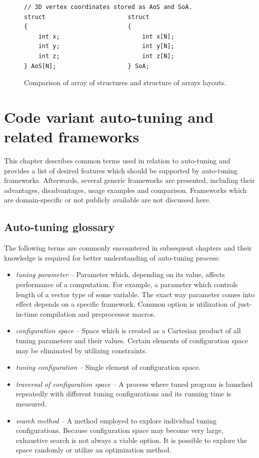 \documentclass
[
    digital, %
    oneside, %
    table, %
    nolof, %
    nolot, %
    nocover %
]{fithesis3}
\begin{document}
\begin{figure}
\begin{lstlisting}
// 3D vertex coordinates stored as AoS and SoA.
struct                       struct
{                            {
    int x;                       int x[N];
    int y;                       int y[N];
    int z;                       int z[N];
} AoS[N];                    } SoA;
\end{lstlisting}
\caption{Comparison of array of structures and structure of arrays layouts.}
\label{aos_soa}
\end{figure}

\chapter{Code variant auto-tuning and related frameworks}
This chapter describes common terms used in relation to auto-tuning and provides a list of desired features which should be supported by auto-tuning
frameworks. Afterwards, several generic frameworks are presented, including their advantages, disadvantages, usage examples and comparison. Frameworks
which are domain-specific or not publicly available are not discussed here.

\section{Auto-tuning glossary}
The following terms are commonly encountered in subsequent chapters and their knowledge is required for better understanding of auto-tuning process:
\begin{itemize}
    \item \textit{tuning parameter} -- Parameter which, depending on its value, affects performance of a computation. For example, a parameter which
    controls length of a vector type of some variable. The exact way parameter comes into effect depends on a specific framework. Common option is
    utilization of just-in-time compilation and preprocessor macros.
    \item \textit{configuration space} -- Space which is created as a Cartesian product of all tuning parameters and their values. Certain elements of
    configuration space may be eliminated by utilizing constraints.
    \item \textit{tuning configuration} -- Single element of configuration space.
    \item \textit{traversal of configuration space} -- A process where tuned program is launched repeatedly with different tuning configurations and
    its running time is measured.
    \item \textit{search method} -- A method employed to explore individual tuning configurations. Because configuration space may become very large,
    exhaustive search is not always a viable option. It is possible to explore the space randomly or utilize an optimization method.
\end{itemize}
\end{document}
